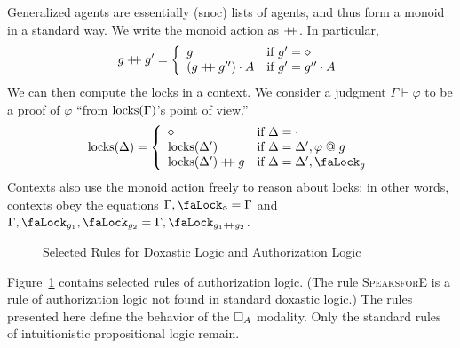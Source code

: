 Generalized agents are essentially (snoc) lists of agents, and thus form a monoid in a standard way.
We write the monoid action as $\mathbin{+\!\!+}$.
In particular, $$g \mathbin{+\!\!+} g' = \left\{\begin{array}{ll} g & \text{if $g' = \diamond$}\\ (g \mathbin{+\!\!+} g'') \cdot A & \text{if $g' = g'' \cdot A$}\end{array}\right.$$
We can then compute the locks in a context.
We consider a judgment $\Gamma \vdash \varphi$ to be a proof of $\varphi$ ``from $\text{locks}(\Gamma)$'s point of view.''
$$\locks{\Delta} = \left\{\begin{array}{ll} \diamond & \text{if $\Delta = \cdot$}\\ \locks{\Delta'} & \text{if $\Delta = \Delta', \varphi \at g$}\\ \locks{\Delta'} \join g & \text{if $\Delta = \Delta', \lock_g$}\end{array}\right.$$
Contexts also use the monoid action freely to reason about locks; in other words, contexts obey the equations $\Gamma, \lock_\diamond = \Gamma$ and $\Gamma, \lock_{g_1}, \lock_{g_2} = \Gamma, \lock_{g_1 \join g_2}$.

\begin{figure}
  \centering

  
  \caption{Selected Rules for Doxastic Logic and Authorization Logic}
  \label{fig:dox-rules}
\end{figure}

Figure~\ref{fig:dox-rules} contains selected rules of authorization logic.
(The rule \textsc{SpeaksforE} is a rule of authorization logic not found in standard doxastic logic.)
The rules presented here define the behavior of the $\mathop{\square_{A}} $ modality.
Only the standard rules of intuitionistic propositional logic remain.

